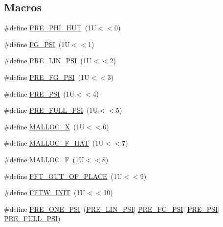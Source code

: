 \subsection*{Macros}
\begin{DoxyCompactItemize}
\item 
\#define \hyperlink{group__nfft_gada3a356fdaf5840f98374a0a7aaf3e9c}{P\-R\-E\-\_\-\-P\-H\-I\-\_\-\-H\-U\-T}~(1\-U$<$$<$0)
\item 
\#define \hyperlink{group__nfft_ga01ebac2d2071639df189f083fc9f24eb}{F\-G\-\_\-\-P\-S\-I}~(1\-U$<$$<$1)
\item 
\#define \hyperlink{group__nfft_gabb1ad048b695cb806baf010c5d1b2caf}{P\-R\-E\-\_\-\-L\-I\-N\-\_\-\-P\-S\-I}~(1\-U$<$$<$2)
\item 
\#define \hyperlink{group__nfft_ga9c5a5ab61009a801082897ca40a1658c}{P\-R\-E\-\_\-\-F\-G\-\_\-\-P\-S\-I}~(1\-U$<$$<$3)
\item 
\#define \hyperlink{group__nfft_ga959463a5c7723ccef5057ddcb784b40c}{P\-R\-E\-\_\-\-P\-S\-I}~(1\-U$<$$<$4)
\item 
\#define \hyperlink{group__nfft_ga7ad8a7e19519b16340dabec48899c6a4}{P\-R\-E\-\_\-\-F\-U\-L\-L\-\_\-\-P\-S\-I}~(1\-U$<$$<$5)
\item 
\#define \hyperlink{group__nfft_ga353185384f87de0dc4320a82652ef724}{M\-A\-L\-L\-O\-C\-\_\-\-X}~(1\-U$<$$<$6)
\item 
\#define \hyperlink{group__nfft_ga02d52cb02b6cfdbc3e4d5fd4de1aef9e}{M\-A\-L\-L\-O\-C\-\_\-\-F\-\_\-\-H\-A\-T}~(1\-U$<$$<$7)
\item 
\#define \hyperlink{group__nfft_gaa7b5098f4136080bbe0dd989973e2a69}{M\-A\-L\-L\-O\-C\-\_\-\-F}~(1\-U$<$$<$8)
\item 
\#define \hyperlink{group__nfft_ga9193f768d5839892d0e303080c370eaf}{F\-F\-T\-\_\-\-O\-U\-T\-\_\-\-O\-F\-\_\-\-P\-L\-A\-C\-E}~(1\-U$<$$<$9)
\item 
\#define \hyperlink{group__nfft_gad3fe6867a3351441c6f44dd5a3746f5b}{F\-F\-T\-W\-\_\-\-I\-N\-I\-T}~(1\-U$<$$<$10)
\item 
\#define \hyperlink{group__nfft_ga44c85197c6bdcf4b632aeff5e94d5329}{P\-R\-E\-\_\-\-O\-N\-E\-\_\-\-P\-S\-I}~(\hyperlink{group__nfft_gabb1ad048b695cb806baf010c5d1b2caf}{P\-R\-E\-\_\-\-L\-I\-N\-\_\-\-P\-S\-I}$\vert$ \hyperlink{group__nfft_ga9c5a5ab61009a801082897ca40a1658c}{P\-R\-E\-\_\-\-F\-G\-\_\-\-P\-S\-I}$\vert$ \hyperlink{group__nfft_ga959463a5c7723ccef5057ddcb784b40c}{P\-R\-E\-\_\-\-P\-S\-I}$\vert$ \hyperlink{group__nfft_ga7ad8a7e19519b16340dabec48899c6a4}{P\-R\-E\-\_\-\-F\-U\-L\-L\-\_\-\-P\-S\-I})
\end{DoxyCompactItemize}
